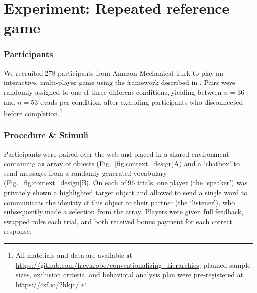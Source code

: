 


			
\section{Experiment: Repeated reference game}

\subsubsection{Participants}

We recruited 278 participants from Amazon Mechanical Turk to play an interactive, multi-player game using the framework described in . Pairs were randomly assigned to one of three different conditions, yielding between $n=36$ and $n=53$ dyads per condition, after excluding participants who disconnected before completion.\footnote{All materials and data are available at \url{https://github.com/hawkrobe/conventionalizing_hierarchies}; planned sample sizes, exclusion criteria, and behavioral analysis plan were pre-registered at \url{https://osf.io/2hkjc/}.}

\subsubsection{Procedure \& Stimuli}
Participants were paired over the web and placed in a shared environment containing an array of objects (Fig.\ \ref{fig:context_design}A) and a `chatbox' to send messages from a randomly generated vocabulary (Fig.\ \ref{fig:context_design}B). On each of 96 trials, one player (the `speaker') was privately shown a highlighted target object and allowed to send a single word to communicate the identity of this object to their partner (the `listener'), who subsequently made a selection from the array. Players were given full feedback, swapped roles each trial, and both received bonus payment for each correct response.

